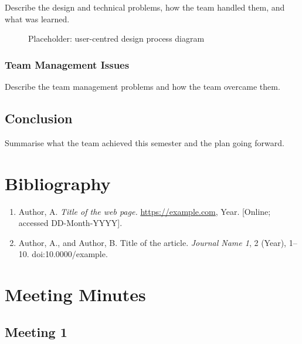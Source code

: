 \documentclass[
  12pt,
  a4paper,
]{report}
\providecommand{\tightlist}{%
  \setlength{\itemsep}{0pt}\setlength{\parskip}{0pt}}
\begin{document}
Describe the design and technical problems, how the team handled them,
and what was learned.

\begin{figure}
\centering
{}
\caption{Placeholder: user-centred design process diagram}
\end{figure}

\subsection{Team Management Issues}\label{team-management-issues}

Describe the team management problems and how the team overcame them.

\section{Conclusion}\label{conclusion}

Summarise what the team achieved this semester and the plan going
forward.

\chapter*{Bibliography}\label{bibliography}

\begin{enumerate}
\def\labelenumi{\arabic{enumi}.}
\tightlist
\item
  \protect{}\label{ref-1}{}Author, A. \emph{Title of the
  web page.} \url{https://example.com}, Year. {[}Online; accessed
  DD-Month-YYYY{]}.
\item
  \protect{}\label{ref-2}{}Author, A., and Author, B. Title
  of the article. \emph{Journal Name 1}, 2 (Year), 1--10.
  doi:10.0000/example.
\end{enumerate}

\appendix

\chapter{Meeting Minutes}\label{meeting-minutes}

\section{Meeting 1}\label{meeting-1}
\end{document}
